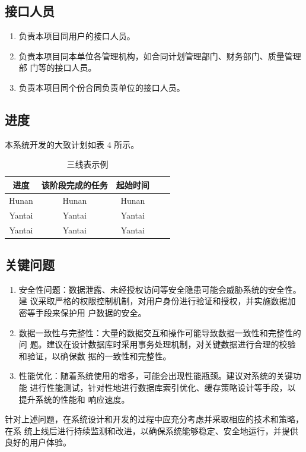 \documentclass[
    report,     %
    oneside,    %
    UTF8,       %
    zihao=-4    %
]{config} %
\begin{document}
\subsection{接口人员}
\begin{enumerate}[label=(\arabic*)]
\item 负责本项目同用户的接口人员。
\item 负责本项目同本单位各管理机构，如合同计划管理部门、财务部门、质量管理部
门等的接口人员。
\item 负责本项目同个份合同负责单位的接口人员。
\end{enumerate}
\subsection{进度}
本系统开发的大致计划如表 4 所示。
\begin{table}[H] %
    \centering %
    \caption{三线表示例} %
    \label{tab:three-line} %
    \renewcommand\arraystretch{0.85} %
    \setlength{\tabcolsep}{12pt} %
    \begin{tabular}{ccccc} %
        \toprule[1.5pt] %
        \textbf{进度} & \textbf{该阶段完成的任务} & \textbf{起始时间} \\ %
        \midrule[0.8pt] %
            Hunan & Hunan & Hunan \\ %
            Yantai & Yantai & Yantai \\ %
            Yantai & Yantai & Yantai \\ %
        \hline\hline %
    \end{tabular}
\end{table}
\subsection{关键问题}
\begin{enumerate}[label=(\arabic*)]
\item 安全性问题：数据泄露、未经授权访问等安全隐患可能会威胁系统的安全性。建
议采取严格的权限控制机制，对用户身份进行验证和授权，并实施数据加密等手段来保护用
户数据的安全。
\item 数据一致性与完整性：大量的数据交互和操作可能导致数据一致性和完整性的问
题。建议在设计数据库时采用事务处理机制，对关键数据进行合理的校验和验证，以确保数
据的一致性和完整性。
\item 性能优化：随着系统使用的增多，可能会出现性能瓶颈。建议对系统的关键功能
进行性能测试，针对性地进行数据库索引优化、缓存策略设计等手段，以提升系统的性能和
响应速度。
\end{enumerate}
针对上述问题，在系统设计和开发的过程中应充分考虑并采取相应的技术和策略，在系
统上线后进行持续监测和改进，以确保系统能够稳定、安全地运行，并提供良好的用户体验。
\end{document}
